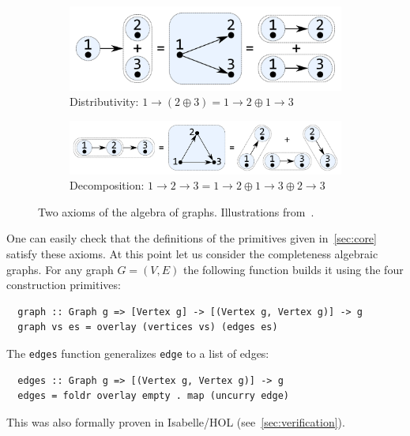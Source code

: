 \documentclass{article}
\newcommand{\hs}{\texttt}
\newcommand{\overlay}{\oplus}
\newcommand{\connect}{\rightarrow}
\begin{document}
\begin{figure}
  \begin{subfigure}[b]{0.4\linewidth}
    \centerline{\includegraphics[scale=0.24]{fig/ax-distributivity.pdf}}
    \caption{Distributivity: $1 \connect (2 \overlay 3) = 1 \connect 2 \overlay
      1 \connect 3$ }
  \end{subfigure}
  \hspace{12mm}
  \begin{subfigure}[b]{0.5\linewidth}
    \centerline{\includegraphics[scale=0.24]{fig/ax-decomposition.pdf}}
    \caption{Decomposition: $1 \connect 2 \connect 3 = {1 \connect 2} \overlay
      1 \connect 3 \overlay 2 \connect 3$}
  \end{subfigure}
  \vspace{-1mm}
  \caption{Two axioms of the algebra of graphs. Illustrations from~\cite{mokhov2017algebraic}.\label{fig:axioms}}
\end{figure}
One can easily check that the definitions of the primitives given
in~\autoref{sec:core} satisfy these axioms. At this point let us consider the
completeness algebraic graphs. For any graph $G=(V,E)$ the following function
builds it using the four construction primitives:
\begin{verbatim}
  graph :: Graph g => [Vertex g] -> [(Vertex g, Vertex g)] -> g
  graph vs es = overlay (vertices vs) (edges es)
\end{verbatim}
The \hs{edges} function generalizes \hs{edge} to a list of edges:
\begin{verbatim}
  edges :: Graph g => [(Vertex g, Vertex g)] -> g
  edges = foldr overlay empty . map (uncurry edge)
\end{verbatim}
This was also formally proven in Isabelle/HOL (see~\autoref{sec:verification}).
\end{document}
